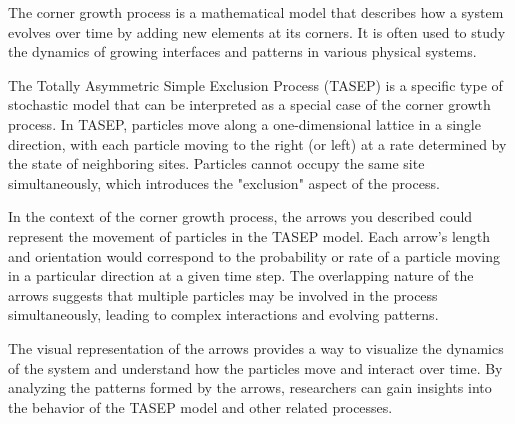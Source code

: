 The corner growth process is a mathematical model that describes how a system evolves over time by adding new elements at its corners. It is often used to study the dynamics of growing interfaces and patterns in various physical systems.

The Totally Asymmetric Simple Exclusion Process (TASEP) is a specific type of stochastic model that can be interpreted as a special case of the corner growth process. In TASEP, particles move along a one-dimensional lattice in a single direction, with each particle moving to the right (or left) at a rate determined by the state of neighboring sites. Particles cannot occupy the same site simultaneously, which introduces the "exclusion" aspect of the process.

In the context of the corner growth process, the arrows you described could represent the movement of particles in the TASEP model. Each arrow's length and orientation would correspond to the probability or rate of a particle moving in a particular direction at a given time step. The overlapping nature of the arrows suggests that multiple particles may be involved in the process simultaneously, leading to complex interactions and evolving patterns.

The visual representation of the arrows provides a way to visualize the dynamics of the system and understand how the particles move and interact over time. By analyzing the patterns formed by the arrows, researchers can gain insights into the behavior of the TASEP model and other related processes.